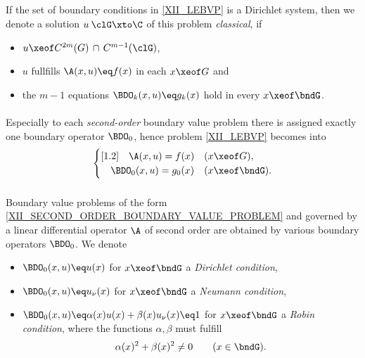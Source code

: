 \documentclass[11pt,twoside]{article}
\def\G{G}
\begin{document}
\subparagraph{} %
If the set of boundary conditions in \eqref{XII_LEBVP} is a Dirichlet system,
then we denote a solution $u \: \clG \xto \C$
of this problem \textit{classical},
if
\begin{itemize}[leftmargin=9mm]
\item[(a)] $u \xeof C^{2m}(\G) \, \cap \, C^{m-1}(\clG)$,
\item[(b)] $u$ fullfills $\A(x,u) \eq f(x)$ in each $x \xeof G$ and
\item[(c)] the $m{-}1$ equations $\BDO_k(x,u) \eq g_k(x)$ hold
           in every $x \xeof \bndG$.
\end{itemize}

\paragraph{} %
Especially to each \textit{second-order} boundary value problem
there is assigned exactly one boundary operator $\BDO_0$,
hence problem \eqref{XII_LEBVP} becomes into
\begin{equation}\label{XII_SECOND_ORDER_BOUNDARY_VALUE_PROBLEM}
\begin{cases}[1.2]
\quad \A(x,u)     = f(x)   & (x \xeof \G),\\
\quad \BDO_0(x,u) = g_0(x) & (x \xeof \bndG).\\
\end{cases}
\end{equation}

\subparagraph{} %
Boundary value problems of the form \eqref{XII_SECOND_ORDER_BOUNDARY_VALUE_PROBLEM}
and governed by a linear differential operator $\A$ of second order
are obtained by various boundary operators $\BDO_0$.
We denote

\begin{itemize}[leftmargin=15mm,itemsep=2pt]
\item[(BC-1)]
\;$\BDO_0(x,u) \eq u(x)$ for $x \xeof \bndG$ a \textit{Dirichlet condition},

\item[(BC-2)]
\;$\BDO_0(x,u) \eq u_{\nu}(x)$ for $x \xeof \bndG$ a \textit{Neumann condition},

\item[(BC-3)]
\;$\BDO_0(x,u) \eq \alpha(x)u(x)+\beta(x) u_{\nu}(x) \eq 1$ for $x \xeof \bndG$ 
a \textit{Robin condition},
where the functions $\alpha, \beta$ must fulfill 
\[
\alpha(x)^2 + \beta(x)^2 \neq 0 \quad \quad (x \in \bndG).
\]
\end{itemize}
\end{document}
